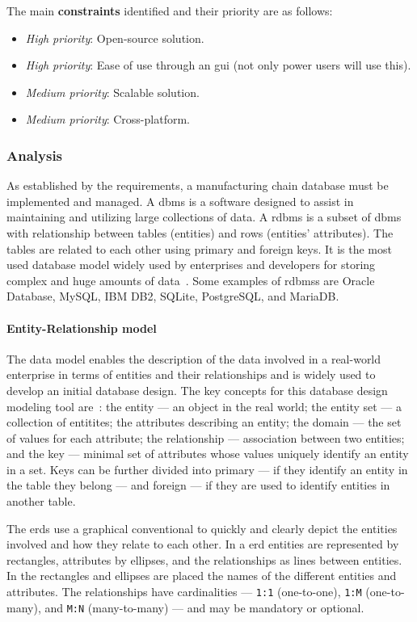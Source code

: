 The main \textbf{constraints} identified and their
priority are as follows:
\begin{itemize}
\item \emph{High priority}: Open-source solution.
\item \emph{High priority}: Ease of use through an \gls{gui} (not only power
  users will use this).
\item \emph{Medium priority}: Scalable solution.
\item \emph{Medium priority}: Cross-platform.
\end{itemize}

\subsubsection{Analysis}%
\label{sec:analysis}
As established by the requirements, a manufacturing chain database
must be implemented and managed. A \gls{dbms} is a software designed to assist in maintaining and utilizing
large collections of data.
A \gls{rdbms} is a subset of \gls{dbms} with relationship between tables (entities)
and rows (entities' attributes). The tables are related to each other
using primary and foreign keys. It is the most used database model widely used
by enterprises and developers for storing complex and huge amounts of
data~\cite{ramakrishnan2003database}. Some examples of \glspl{rdbms} are Oracle
Database, MySQL, IBM DB2, SQLite, PostgreSQL, and MariaDB.

\paragraph{Entity-Relationship model}
The  data model enables the description of the data involved in a
real-world enterprise in terms of entities and their relationships and is widely
used to develop an initial database design. The
key concepts for this database design modeling tool
are~\cite{ramakrishnan2003database}: the entity --- an object in the real world;
the entity set --- a collection of entitites; the attributes describing an
entity; the domain --- the set of values for each attribute; the relationship
--- association between two entities; and the key --- minimal set of attributes
whose values uniquely identify an entity in a set. Keys can be further divided
into primary --- if they identify an entity in the table they belong --- and
foreign --- if they are used to identify entities in another table.

The \glspl{erd} use a graphical conventional to quickly and clearly depict the
entities involved and how they relate to each other. In a \gls{erd} entities are
represented by rectangles, attributes by ellipses, and the relationships as
lines between entities. In the rectangles and ellipses are placed the names of
the different entities and attributes. The relationships have cardinalities --- \texttt{1:1}
(one-to-one), \texttt{1:M} (one-to-many), and \texttt{M:N} (many-to-many) ---
and may be mandatory or optional.

